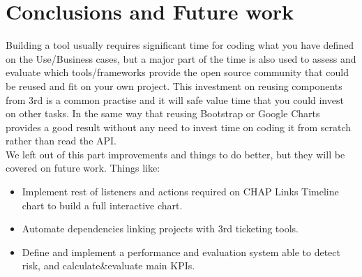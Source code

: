 \chapter{Conclusions and Future work}
Building a tool usually requires significant time for coding what you have
defined on the Use/Business cases, but a major part of the time is also used to
assess and evaluate which tools/frameworks provide the open source community
that could be reused and fit on your own project. This investment on reusing
components from 3rd is a common practise and it will safe value time that you
could invest on other tasks. 
In the same way that reusing Bootstrap or Google
Charts provides a good result without any need to invest time on coding it from
scratch rather than read the API.\\


We left out of this part improvements and things to do better, but they will be
covered on future work. Things like:

\begin{itemize}
	\item Implement rest of listeners and actions required on CHAP Links Timeline
	chart to build a full interactive chart.
	\item Automate dependencies linking projects with 3rd ticketing tools.
	\item Define and implement a performance and evaluation system able to detect
	risk, and calculate&evaluate main KPIs.
\end{itemize}
